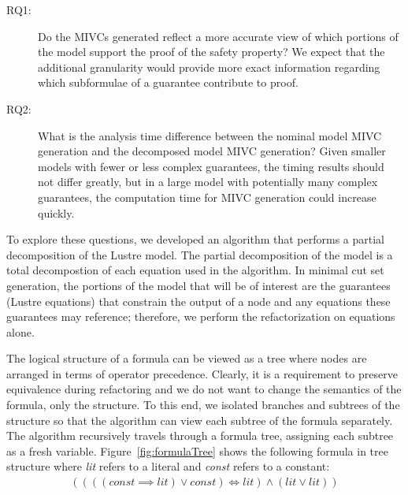 \begin{description}
\item[RQ1:] Do the MIVCs generated reflect a more accurate view of which portions of the model support the proof of the safety property? We expect that the additional granularity would provide more exact information regarding which subformulae of a guarantee contribute to proof.

\item [RQ2:] What is the analysis time difference between the nominal model MIVC generation and the decomposed model MIVC generation? Given smaller models with fewer or less complex guarantees, the timing results should not differ greatly, but in a large model with potentially many complex guarantees, the computation time for MIVC generation could increase quickly. 
 
\end{description}

To explore these questions, we developed an algorithm that performs a partial decomposition of the  Lustre model. The partial decomposition of the model is a total decompostion of each equation used in the \aivcalg algorithm. In minimal cut set generation, the portions of the model that will be of interest are the guarantees (Lustre equations) that constrain the output of a node and any equations these guarantees may reference; therefore, we perform the refactorization on equations alone. 

The logical structure of a formula can be viewed as a tree where nodes are arranged in terms of operator precedence. Clearly, it is a requirement to preserve equivalence during refactoring and we do not want to change the semantics of the formula, only the structure. To this end, we isolated branches and subtrees of the structure so that the \aivcalg algorithm can view each subtree of the formula separately. The algorithm recursively travels through a formula tree, assigning each subtree as a fresh variable. Figure~\ref{fig:formulaTree} shows the following formula in tree structure where \textit{lit} refers to a literal and \textit{const} refers to a constant:
\begin{gather*}
((((\mathit{const} \implies \mathit{lit}) \lor \mathit{const}) \iff \mathit{lit} ) \land (\mathit{lit}  \lor \mathit{lit} )) 
\end{gather*} 

